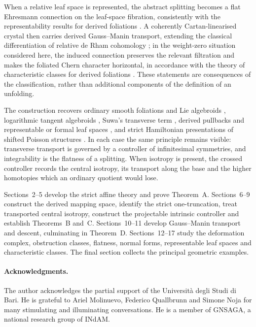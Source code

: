 \documentclass[11pt,reqno,a4paper,dvipsnames,x11names]{amsart}
\numberwithin{equation}{section}
\theoremstyle{plain}
\theoremstyle{definition}
\theoremstyle{remark}
\begin{document}
When a relative leaf space is represented, the abstract splitting becomes a flat Ehresmann connection on the leaf-space fibration, consistently with the representability results for derived foliations \cite{TVRH,TV}. A coherently Cartan-linearised crystal then carries derived Gauss--Manin transport, extending the classical differentiation of relative de Rham cohomology \cite{KatzOda68}; in the weight-zero situation considered here, the induced connection preserves the relevant filtration \cite{Deligne71,Deligne74} and makes the foliated Chern character horizontal, in accordance with the theory of characteristic classes for derived foliations \cite{TVGRR}. These statements are consequences of the classification, rather than additional components of the definition of an unfolding.

\medskip
 
The construction recovers ordinary smooth foliations and Lie algebroids \cite{Rinehart63,Nuiten}, logarithmic tangent algebroids \cite{Kato89}, Suwa's transverse term \cite{Suwa81,Suwa83}, derived pullbacks and representable or formal leaf spaces \cite{TVRH,TV}, and strict Hamiltonian presentations of shifted Poisson structures \cite{PTVV,CPTVV}. In each case the same principle remains visible: transverse transport is governed by a controller of infinitesimal symmetries, and integrability is the flatness of a splitting. When isotropy is present, the crossed controller records the central isotropy, its transport along the base and the higher homotopies which an ordinary quotient would lose.

\medskip
 
Sections~2--5 develop the strict affine theory and prove Theorem~A. Sections~6--9 construct the derived mapping space, identify the strict one-truncation, treat transported central isotropy, construct the projectable intrinsic controller and establish Theorems~B and~C. Sections~10--11 develop Gauss--Manin transport and descent, culminating in Theorem~D. Sections~12--17 study the deformation complex, obstruction classes, flatness, normal forms, representable leaf spaces and characteristic classes. The final section collects the principal geometric examples.


\medskip\paragraph{\bf Acknowledgments.} The author acknowledges the partial support of the Universit\`a degli Studi di Bari. He is grateful to Ariel Molinuevo, Federico Quallbrunn and Simone Noja for many stimulating and illuminating conversations. He is a member of GNSAGA, a national research group of INdAM.
\end{document}
